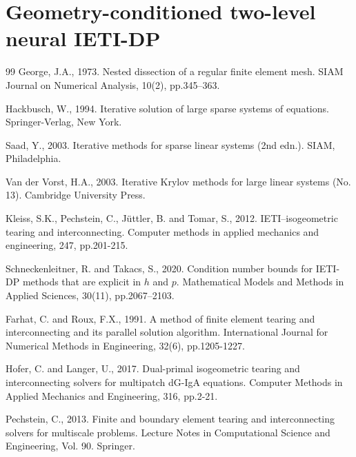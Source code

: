 \documentclass{article}
\theoremstyle{plain}
\numberwithin{equation}{section}
\begin{document}
\section{Geometry-conditioned two-level neural IETI-DP}
\label{sec:method}



\clearpage
\begin{thebibliography}{99}
    George, J.A., 1973. Nested dissection of a regular finite element mesh. SIAM Journal on Numerical Analysis, 10(2), pp.345--363.

    Hackbusch, W., 1994. Iterative solution of large sparse systems of equations. Springer-Verlag, New York.

    Saad, Y., 2003. Iterative methods for sparse linear systems (2nd edn.). SIAM, Philadelphia.

    Van der Vorst, H.A., 2003. Iterative Krylov methods for large linear systems (No. 13). Cambridge University Press.

    Kleiss, S.K., Pechstein, C., Jüttler, B. and Tomar, S., 2012. IETI–isogeometric tearing and interconnecting. Computer methods in applied mechanics and engineering, 247, pp.201-215.

    Schneckenleitner, R. and Takacs, S., 2020. Condition number bounds for IETI-DP methods that are explicit in $h$ and $p$. Mathematical Models and Methods in Applied Sciences, 30(11), pp.2067--2103.

    Farhat, C. and Roux, F.X., 1991. A method of finite element tearing and interconnecting and its parallel solution algorithm. International Journal for Numerical Methods in Engineering, 32(6), pp.1205-1227.

    Hofer, C. and Langer, U., 2017. Dual-primal isogeometric tearing and interconnecting solvers for multipatch dG-IgA equations. Computer Methods in Applied Mechanics and Engineering, 316, pp.2-21.

    Pechstein, C., 2013. Finite and boundary element tearing and interconnecting solvers for multiscale problems. Lecture Notes in Computational Science and Engineering, Vol. 90. Springer.


\end{thebibliography}
\end{document}
